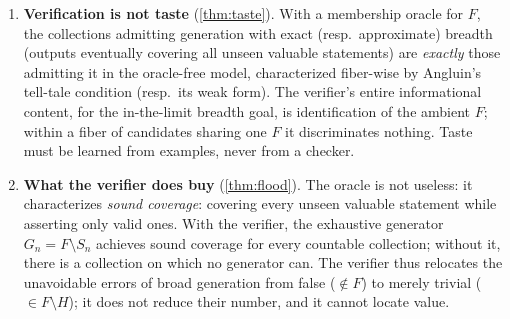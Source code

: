 \documentclass[11pt]{article}
\numberwithin{equation}{section}
\newcommand{\Amb}{F}
\newcommand{\Val}{H}
\newcommand{\Seen}{S}
\theoremstyle{plain}
\theoremstyle{definition}
\theoremstyle{remark}
\begin{document}
\begin{enumerate}
  \item \textbf{Verification is not taste} (\cref{thm:taste}). With a membership oracle for
    $\Amb$, the collections admitting generation with exact (resp.\ approximate) breadth
    (outputs eventually covering all unseen valuable statements) are \emph{exactly} those
    admitting it in the oracle-free model, characterized fiber-wise by Angluin's tell-tale
    condition (resp.\ its weak form). The verifier's entire informational content, for the
    in-the-limit breadth goal, is identification of the ambient $\Amb$; within a fiber of
    candidates sharing one $\Amb$ it discriminates nothing. Taste must be learned from
    examples, never from a checker.

  \item \textbf{What the verifier does buy} (\cref{thm:flood}). The oracle is not useless: it
    characterizes \emph{sound coverage}: covering every unseen valuable statement while
    asserting only valid ones. With the verifier, the exhaustive generator
    $G_n=\Amb\setminus\Seen_n$ achieves sound coverage for every countable collection; without
    it, there is a collection on which no generator can. The verifier thus relocates the
    unavoidable errors of broad generation from false ($\notin\Amb$) to merely trivial
    ($\in\Amb\setminus\Val$); it does not reduce their number, and it cannot locate value.


\end{enumerate}
\end{document}
